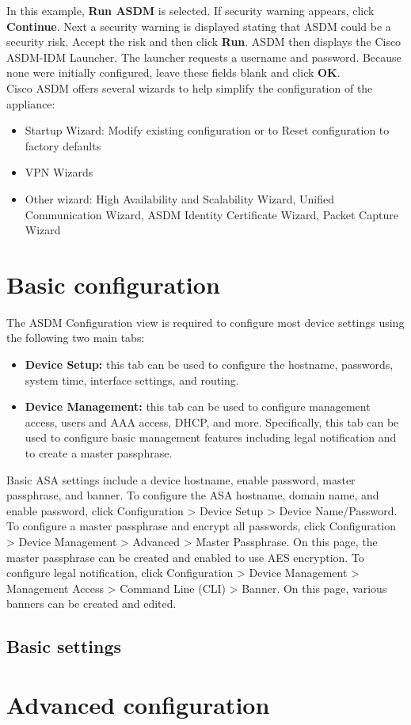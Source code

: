 In this example, \textbf{Run ASDM} is selected. If security warning appears, click \textbf{Continue}. Next a security warning is displayed stating that ASDM could be a security risk. Accept the risk and then click \textbf{Run}. ASDM then displays the Cisco ASDM-IDM Launcher. The launcher requests a username and password. Because none were initially configured, leave these fields blank and click \textbf{OK}.\\


Cisco ASDM offers several wizards to help simplify the configuration of the appliance:

\begin{itemize}
\item Startup Wizard: Modify existing configuration or to Reset configuration to factory defaults
\item VPN Wizards
\item Other wizard: High Availability and Scalability Wizard, Unified Communication Wizard, ASDM Identity Certificate Wizard, Packet Capture Wizard
\end{itemize}


\section{Basic configuration}

The ASDM Configuration view is required to configure most device settings using the following two main tabs:

\begin{itemize}
\item \textbf{Device Setup:} this tab can be used to configure the hostname, passwords, system time, interface settings, and routing.
\item \textbf{Device Management:} this tab can be used to configure management access, users and AAA access, DHCP, and more. Specifically, this tab can be used to configure basic management features including legal notification and to create a master passphrase.
\end{itemize}

Basic ASA settings include a device hostname, enable password, master passphrase, and banner. To configure the ASA hostname, domain name, and enable password, click Configuration > Device Setup > Device Name/Password. To configure a master passphrase and encrypt all passwords, click Configuration > Device Management > Advanced > Master Passphrase. On this page, the master passphrase can be created and enabled to use AES encryption. To configure legal notification, click Configuration > Device Management > Management Access > Command Line (CLI) > Banner. On this page, various banners can be created and edited.



\subsection{Basic settings}



\section{Advanced configuration}